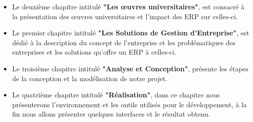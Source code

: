 \begin{itemize}
    \item Le deuxième chapitre intitulé \textbf{"Les œuvres universitaires"}, est consacré à la présentation des œuvres universitaires et l'impact des \acs{ERP} sur celles-ci.
    \item Le premier chapitre intitulé \textbf{"Les Solutions de Gestion d'Entreprise"}, est dédié à la description du concept de l'entreprise et les problématiques des entreprises et les solutions qu'offre un \acs{ERP} à celles-ci.
    \item Le troisième chapitre intitulé \textbf{"Analyse et Conception"}, présente les étapes de la conception et la modélisation de notre projet.
    \item Le quatrième chapitre intitulé \textbf{"Réalisation"}, dans ce chapitre nous présenterons l'environnement et les outils utilisés pour le développement, à la fin nous allons présenter quelques interfaces et le résultat obtenu.
\end{itemize}